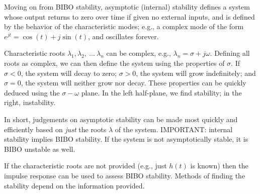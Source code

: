 \documentclass{article}
\begin{document}
Moving on from BIBO stability, asymptotic (internal) stability defines a system whose output returns to zero over time if given no external inputs, and is defined by the behavior of the characteristic modes; e.g., a complex mode of the form \(e^{jt} = \cos{(t)} + j\sin{(t)}\), and oscillates forever.

Characteristic roots \(\lambda_1, \lambda_2, \ ... \ \lambda_n\) can be complex, e.g., \(\lambda_n = \sigma + j\omega\). Defining all roots as complex, we can then define the system using the properties of \(\sigma\). If \(\sigma < 0\), the system will decay to zero; \(\sigma > 0\), the system will grow indefinitely; and \(\sigma = 0\), the system will neither grow nor decay. These properties can be quickly deduced using the \(\sigma-\omega\) plane. In the left half-plane, we find stability; in the right, instability.

In short, judgements on asymptotic stability can be made most quickly and efficiently based on \textit{just} the roots \(\lambda\) of the system. IMPORTANT: internal stability implies BIBO stability. If the system is not asymptotically stable, it is BIBO unstable as well.

If the characteristic roots are not provided (e.g., just \(h(t)\) is known) then the impulse response can be used to assess BIBO stability. Methods of finding the stability depend on the information provided. 
\end{document}
